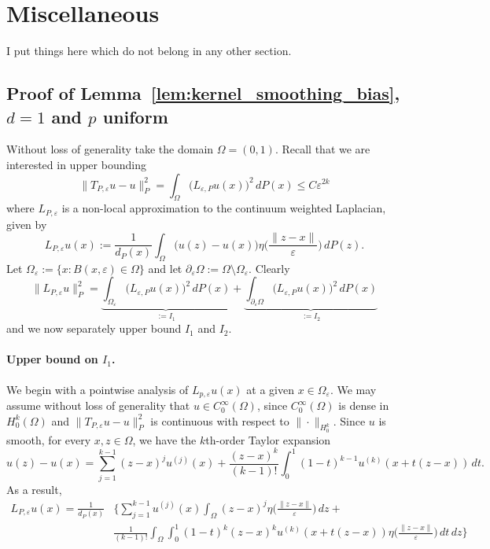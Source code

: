 \documentclass{article}
\newcommand{\1}{\mathbf{1}}
\theoremstyle{definition}
\theoremstyle{remark}
\begin{document}
\section{Miscellaneous}
I put things here which do not belong in any other section.

\subsection{Proof of Lemma~\ref{lem:kernel_smoothing_bias}, $d = 1$ and $p$ uniform}
\label{subsec:kernel_smoothing_bias_pf_1d_uniform_p}
Without loss of generality take the domain $\Omega = (0,1)$. Recall that we are interested in upper bounding
\begin{equation*}
\|T_{P,\varepsilon}u - u\|_{P}^2 = \int_{\Omega} \bigl(L_{\varepsilon,P}u(x)\bigr)^2 \,dP(x) \leq C\varepsilon^{2k}
\end{equation*}
where $L_{P,\varepsilon}$ is a non-local approximation to the continuum weighted Laplacian, given by
\begin{equation*}
L_{P,\varepsilon}u(x) := \frac{1}{d_P(x)}\int_{\Omega} \bigl(u(z) - u(x)\bigr) \eta\biggl(\frac{\|z - x\|}{\varepsilon}\biggr) \,dP(z).
\end{equation*}
Let $\Omega_{\varepsilon} := \{x: B(x,\varepsilon) \in \Omega\}$ and let $\partial_{\varepsilon}\Omega := \Omega \setminus \Omega_{\varepsilon}$. Clearly
\begin{equation*}
\|L_{P,\varepsilon}u\|_{P}^2 = \underbrace{\int_{\Omega_{\varepsilon}} \bigl(L_{\varepsilon,P}u(x)\bigr)^2 \,dP(x)}_{:=I_1} + \underbrace{\int_{\partial_{\varepsilon}\Omega} \bigl(L_{\varepsilon,P}u(x)\bigr)^2 \,dP(x)}_{:=I_2}
\end{equation*}
and we now separately upper bound $I_1$ and $I_2$.

\paragraph{Upper bound on $I_1$.}
We begin with a pointwise analysis of $L_{p,\varepsilon}u(x)$ at a given $x \in \Omega_{\varepsilon}$. We may assume without loss of generality that $u \in C_0^{\infty}(\Omega)$, since $C_0^{\infty}(\Omega)$ is dense in $H_0^k(\Omega)$ and $\|T_{P,\varepsilon}u - u\|_P^2$ is continuous with respect to $\|\cdot\|_{H_0^k}$. Since $u$ is smooth, for every $x,z \in \Omega$, we have the $k$th-order Taylor expansion
\begin{equation*}
u(z) - u(x) = \sum_{j = 1}^{k - 1} (z - x)^{j} u^{(j)}(x)  + \frac{(z - x)^k}{(k - 1)!}\int_{0}^{1}(1 - t)^{k - 1}u^{(k)}(x + t(z - x))\,dt.
\end{equation*}
As a result,
\begin{equation}
\label{pf:kernel_smoothing_bias_1d_1}
\begin{aligned}
L_{P,\varepsilon}u(x) = \frac{1}{d_P(x)} & \Biggl\{\sum_{j = 1}^{k - 1} u^{(j)}(x) \int_{\Omega}(z - x)^{j}\eta\biggl(\frac{\|z - x\|}{\varepsilon}\biggr)\,dz + \\ 
& \frac{1}{(k - 1)!} \int_{\Omega} \int_{0}^{1} (1 - t)^k (z - x)^k u^{(k)}(x + t(z - x)) \eta\biggl(\frac{\|z - x\|}{\varepsilon}\biggr) \,dt \,dz \Biggr\}
\end{aligned}
\end{equation} 
\end{document}
